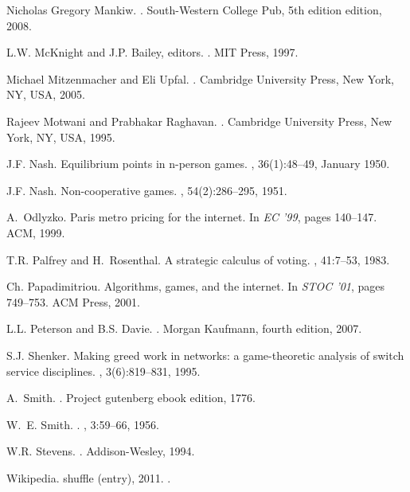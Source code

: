 \documentclass[letterpaper,10pt]{llncs}
\begin{document}
\begin{thebibliography}{1}
{Nicholas Gregory} Mankiw.
.
\newblock South-Western College Pub, 5th edition edition, 2008.

L.W. McKnight and J.P. Bailey, editors.
.
\newblock MIT Press, 1997.

Michael Mitzenmacher and Eli Upfal.
.
\newblock Cambridge University Press, New York, NY, USA, 2005.

Rajeev Motwani and Prabhakar Raghavan.
.
\newblock Cambridge University Press, New York, NY, USA, 1995.

J.F. Nash.
\newblock Equilibrium points in n-person games.
,
  36(1):48--49, January 1950.

J.F. Nash.
\newblock Non-cooperative games.
, 54(2):286--295, 1951.

A.~Odlyzko.
\newblock Paris metro pricing for the internet.
\newblock In {\em EC '99}, pages 140--147. ACM, 1999.

T.R. Palfrey and H.~Rosenthal.
\newblock A strategic calculus of voting.
, 41:7--53, 1983.

Ch. Papadimitriou.
\newblock Algorithms, games, and the internet.
\newblock In {\em STOC '01}, pages 749--753. ACM Press, 2001.

L.L. Peterson and B.S. Davie.
.
\newblock Morgan Kaufmann, fourth edition, 2007.

S.J. Shenker.
\newblock Making greed work in networks: a game-theoretic analysis of switch
  service disciplines.
, 3(6):819--831, 1995.

A.~Smith.
.
\newblock Project gutenberg ebook edition, 1776.

W.~E. Smith.
.
, 3:59--66, 1956.

W.R. Stevens.
.
\newblock Addison-Wesley, 1994.

Wikipedia.
 shuffle (entry), 2011.
.

\end{thebibliography}
\end{document}
